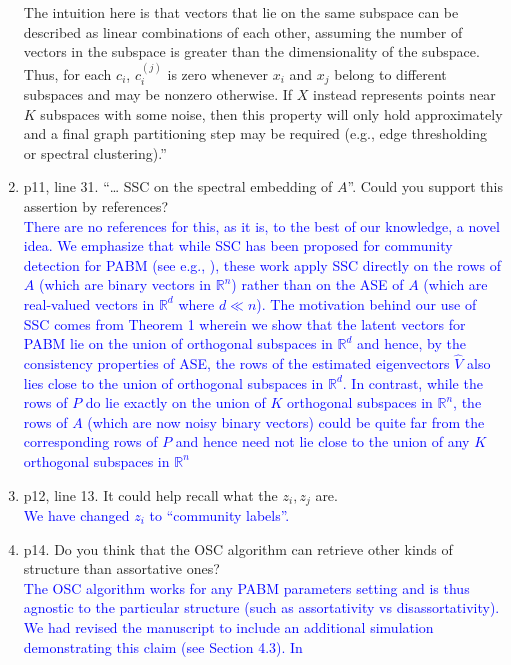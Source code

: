 \documentclass[
]{article}
\begin{document}
\begin{enumerate}
{  The intuition here is that vectors that lie on the same subspace can
  be described as linear combinations of each other, assuming the number
  of vectors in the subspace is greater than the dimensionality of the
  subspace. Thus, for each $c_i$, $c_i^{(j)}$ is zero whenever $x_i$ and $x_j$ belong to different subspaces and may be nonzero otherwise. If \(X\) instead represents points near \(K\) subspaces with some noise, 
  then this property will only hold approximately and 
  a final graph partitioning step may be required 
  (e.g., edge thresholding or spectral clustering).''
  }
\item
  p11, line 31. ``\ldots{} SSC on the spectral embedding of \(A\)''.
  Could you support this assertion by references?\\
  \textcolor{blue}{
  There are no references for this, as it is, to the best of our knowledge, a novel idea. 
  We emphasize that while SSC has been proposed for community detection
  for PABM (see e.g., \citep{noroozi2019estimation}), these work apply SSC
  directly on the rows of $A$ (which are binary vectors in
  $\mathbb{R}^{n}$) rather than on the ASE of $A$ (which are real-valued
  vectors in $\mathbb{R}^{d}$ where $d \ll n$). The motivation behind
  our use of SSC comes  from Theorem 1 wherein we show that the latent
  vectors for PABM lie on the union of orthogonal subspaces in $\mathbb{R}^{d}$ and hence,
  by the consistency properties of ASE, the rows of the estimated
  eigenvectors $\hat{V}$ also lies close to the union of orthogonal
  subspaces in $\mathbb{R}^{d}$. In contrast, while the rows of $P$ do lie exactly on the
  union of $K$ orthogonal subspaces in $\mathbb{R}^{n}$, the rows of $A$
  (which are now noisy binary vectors) could be quite far from the
  corresponding rows of $P$ and hence need not lie close to the union
  of any $K$ orthogonal subspaces in $\mathbb{R}^{n}$ 
  }
\item
  p12, line 13. It could help recall what the \(z_i, z_j\) are.\\
  \textcolor{blue}{
  We have changed $z_i$ to ``community labels''.
  }
\item
  p14. Do you think that the OSC algorithm can retrieve other kinds of
  structure than assortative ones?\\
  \textcolor{blue}{
  The OSC algorithm works for any PABM parameters setting and is thus
  agnostic to the particular structure (such as assortativity vs
  disassortativity). We had revised the manuscript to include an
  additional simulation demonstrating this claim (see Section 4.3). In
}
\end{enumerate}
\end{document}
